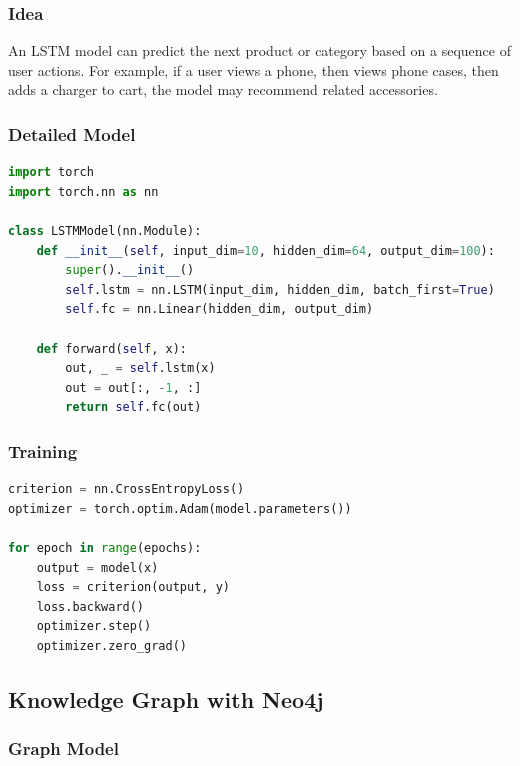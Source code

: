 \documentclass[12pt,a4paper]{article}
\begin{document}
\subsubsection{Idea}

An LSTM model can predict the next product or category based on a sequence of user actions. For example, if a user views a phone, then views phone cases, then adds a charger to cart, the model may recommend related accessories.

\subsubsection{Detailed Model}

\begin{lstlisting}[language=Python,caption={Simplified LSTM recommendation model.}]
import torch
import torch.nn as nn

class LSTMModel(nn.Module):
    def __init__(self, input_dim=10, hidden_dim=64, output_dim=100):
        super().__init__()
        self.lstm = nn.LSTM(input_dim, hidden_dim, batch_first=True)
        self.fc = nn.Linear(hidden_dim, output_dim)

    def forward(self, x):
        out, _ = self.lstm(x)
        out = out[:, -1, :]
        return self.fc(out)
\end{lstlisting}

\subsubsection{Training}

\begin{lstlisting}[language=Python,caption={Simplified LSTM training loop.}]
criterion = nn.CrossEntropyLoss()
optimizer = torch.optim.Adam(model.parameters())

for epoch in range(epochs):
    output = model(x)
    loss = criterion(output, y)
    loss.backward()
    optimizer.step()
    optimizer.zero_grad()
\end{lstlisting}

\subsection{Knowledge Graph with Neo4j}

\subsubsection{Graph Model}
\end{document}
